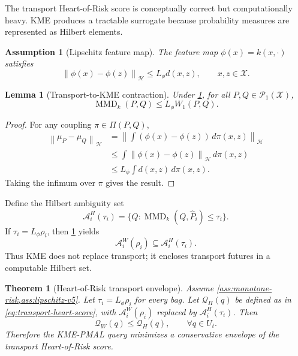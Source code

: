 \documentclass[10pt,journal]{IEEEtran}
\newtheorem{assumption}{Assumption}
\newtheorem{theorem}{Theorem}
\newtheorem{lemma}{Lemma}
\DeclareMathOperator{\MMD}{MMD}
\newcommand{\Pcal}{\mathcal{P}}
\newcommand{\Xcal}{\mathcal{X}}
\newcommand{\Hcal}{\mathcal{H}}
\newcommand{\norm}[1]{\left\lVert #1 \right\rVert}
\newcommand{\Qcal}{\mathcal{Q}}
\newcommand{\Acal}{\mathcal{A}}
\begin{document}
The transport Heart-of-Risk score is conceptually correct but computationally heavy. KME produces a tractable surrogate because probability measures are represented as Hilbert elements.

\begin{assumption}[Lipschitz feature map]
\label{ass:lipschitz-v5}
The feature map $\phi(x)=k(x,\cdot)$ satisfies
\begin{equation}
    \norm{\phi(x)-\phi(z)}_{\Hcal}\le L_\phi d(x,z),
    \qquad x,z\in\Xcal.
\end{equation}
\end{assumption}

\begin{lemma}[Transport-to-KME contraction]
\label{lem:transport-kme-v5}
Under \cref{ass:lipschitz-v5}, for all $P,Q\in\Pcal_1(\Xcal)$,
\begin{equation}
    \MMD_k(P,Q)\le L_\phi W_1(P,Q).
\end{equation}
\end{lemma}

\begin{proof}
For any coupling $\pi\in\Pi(P,Q)$,
\begin{equation}
\begin{aligned}
\norm{\mu_P-\mu_Q}_{\Hcal}
&=\left\|\int(\phi(x)-\phi(z))\,d\pi(x,z)\right\|_{\Hcal}\\
&\le \int \norm{\phi(x)-\phi(z)}_{\Hcal}\,d\pi(x,z)\\
&\le L_\phi\int d(x,z)\,d\pi(x,z).
\end{aligned}
\end{equation}
Taking the infimum over $\pi$ gives the result.
\end{proof}

Define the Hilbert ambiguity set
\begin{equation}
\label{eq:hilbert-ball-v5}
    \Acal_i^H(\tau_i)=\{Q:\MMD_k(Q,\widehat P_i)\le \tau_i\}.
\end{equation}
If $\tau_i=L_\phi\rho_i$, then \cref{lem:transport-kme-v5} yields
\begin{equation}
    \Acal_i^W(\rho_i)\subseteq \Acal_i^H(\tau_i).
\end{equation}
Thus KME does not replace transport; it encloses transport futures in a computable Hilbert set.

\begin{theorem}[Heart-of-Risk transport envelope]
\label{thm:heart-risk-envelope-v5}
Assume \cref{ass:monotone-risk,ass:lipschitz-v5}. Let $\tau_i=L_\phi\rho_i$ for every bag. Let $\Qcal_H(q)$ be defined as in \eqref{eq:transport-heart-score}, with $\Acal_i^W(\rho_i)$ replaced by $\Acal_i^H(\tau_i)$. Then
\begin{equation}
    \Qcal_W(q)\le \Qcal_H(q), \qquad \forall q\in U_t.
\end{equation}
Therefore the KME-PMAL query minimizes a conservative envelope of the transport Heart-of-Risk score.
\end{theorem}
\end{document}
